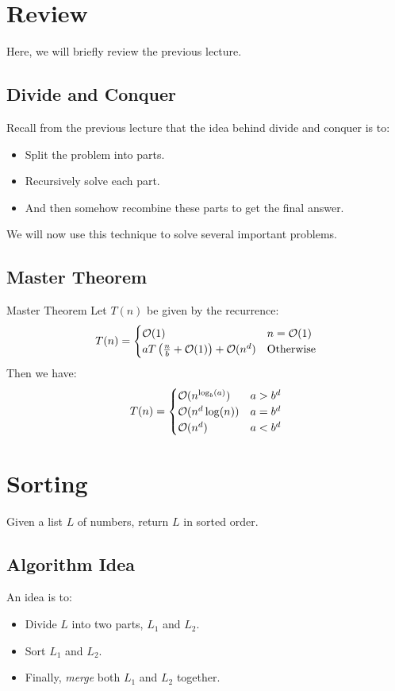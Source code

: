 \documentclass[letterpaper]{article}
\begin{document}
\section{Review}
Here, we will briefly review the previous lecture. 

\subsection{Divide and Conquer}
Recall from the previous lecture that the idea behind divide and conquer is to:
\begin{itemize}
    \item Split the problem into parts. 
    \item Recursively solve each part. 
    \item And then somehow recombine these parts to get the final answer. 
\end{itemize}
We will now use this technique to solve several important problems. 

\subsection{Master Theorem}
\begin{theorem}{Master Theorem}{}
    Let $T(n)$ be given by the recurrence:
    \[T(n) = \begin{cases}
        \mathcal{O}(1) & n = \mathcal{O}(1) \\ 
        aT\left(\frac{n}{b} + \mathcal{O}(1)\right) + \mathcal{O}(n^d) & \text{Otherwise}
    \end{cases}\]
    Then we have: 
    \[T(n) = \begin{cases}
        \mathcal{O}(n^{\log_{b}(a)}) & a > b^d \\ 
        \mathcal{O}(n^d \log(n)) & a = b^d \\ 
        \mathcal{O}(n^d) & a < b^d
    \end{cases}\]
\end{theorem}

\section{Sorting}
Given a list $L$ of numbers, return $L$ in sorted order.

\subsection{Algorithm Idea}
An idea is to: 
\begin{itemize}
    \item Divide $L$ into two parts, $L_1$ and $L_2$. 
    \item Sort $L_1$ and $L_2$. 
    \item Finally, \emph{merge} both $L_1$ and $L_2$ together. 
\end{itemize}
\end{document}
